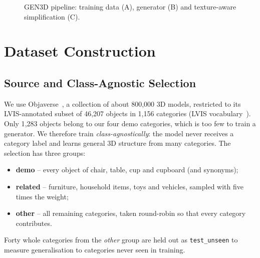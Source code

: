 \begin{figure}[H]
\caption{GEN3D pipeline: training data (A), generator (B) and texture-aware simplification (C).}
\label{fig:pipeline}
\end{figure}

\section{Dataset Construction}
\subsection{Source and Class-Agnostic Selection}
We use Objaverse~\cite{deitke2023objaverse}, a collection of about 800{,}000 3D models, restricted to its LVIS-annotated subset of 46{,}207 objects in 1{,}156 categories (LVIS vocabulary~\cite{gupta2019lvis}). Only 1{,}283 objects belong to our four demo categories, which is too few to train a generator. We therefore train \emph{class-agnostically}: the model never receives a category label and learns general 3D structure from many categories. The selection has three groups:
\begin{itemize}[leftmargin=*]
  \item \textbf{demo} -- every object of chair, table, cup and cupboard (and synonyms);
  \item \textbf{related} -- furniture, household items, toys and vehicles, sampled with five times the weight;
  \item \textbf{other} -- all remaining categories, taken round-robin so that every category contributes.
\end{itemize}
Forty whole categories from the \emph{other} group are held out as \texttt{test\_unseen} to measure generalisation to categories never seen in training.

